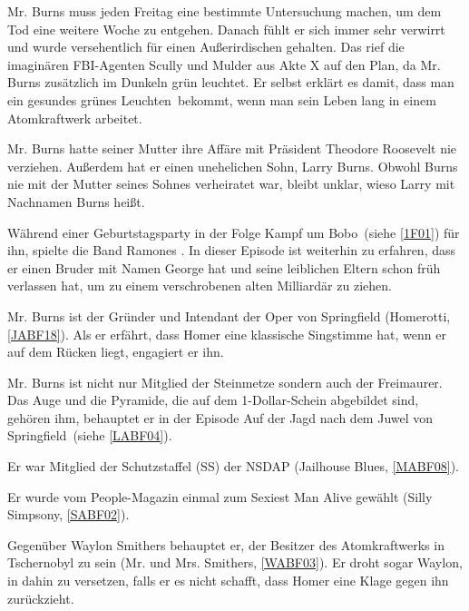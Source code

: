 Mr. Burns muss jeden Freitag eine bestimmte Untersuchung machen, um dem Tod eine weitere Woche zu entgehen. Danach fühlt er sich immer sehr verwirrt und wurde versehentlich für einen Außerirdischen gehalten. Das rief die imaginären FBI-Agenten Scully und Mulder aus Akte X auf den Plan, da Mr. Burns zusätzlich im Dunkeln grün leuchtet. Er selbst erklärt es damit, dass man \glqq ein gesundes grünes Leuchten\grqq\ bekommt, wenn man sein Leben lang in einem Atomkraftwerk arbeitet.

Mr. Burns hatte seiner Mutter ihre Affäre mit Präsident Theodore Roosevelt nie verziehen. Außerdem hat er einen unehelichen Sohn, Larry Burns. Obwohl Burns nie mit der Mutter seines Sohnes verheiratet war, bleibt unklar, wieso Larry mit Nachnamen Burns heißt.

Während einer Geburtstagsparty in der Folge \glqq Kampf um Bobo\grqq\ (siehe \ref{1F01}) für ihn, spielte die Band Ramones \cite{OffizielleHomepage}. In dieser Episode ist weiterhin zu erfahren, dass er einen Bruder mit Namen George hat und seine leiblichen Eltern schon früh verlassen hat, um zu einem verschrobenen alten Milliardär zu ziehen.

Mr. Burns ist der Gründer und Intendant der Oper von Springfield (\glqq Homerotti\grqq , \ref{JABF18}). Als er erfährt, dass Homer eine klassische Singstimme hat, wenn er auf dem Rücken liegt, engagiert er ihn.

Mr. Burns ist nicht nur Mitglied der Steinmetze sondern auch der Freimaurer. Das Auge und die Pyramide, die auf dem 1-Dollar-Schein abgebildet sind, gehören ihm, behauptet er in der Episode \glqq Auf der Jagd nach dem Juwel von Springfield\grqq\ (siehe \ref{LABF04}).

Er war Mitglied der Schutzstaffel (SS) der NSDAP (\glqq Jailhouse Blues\grqq , \ref{MABF08}).

Er wurde vom People-Magazin einmal zum Sexiest Man Alive gewählt (\glqq Silly Simpsony\grqq , \ref{SABF02}).

Gegenüber Waylon Smithers behauptet er, der Besitzer des Atomkraftwerks in Tschernobyl zu sein (\glqq Mr. und Mrs. Smithers\grqq , \ref{WABF03}). Er droht sogar Waylon, in dahin zu versetzen, falls er es nicht schafft, dass Homer eine Klage gegen ihn zurückzieht.

